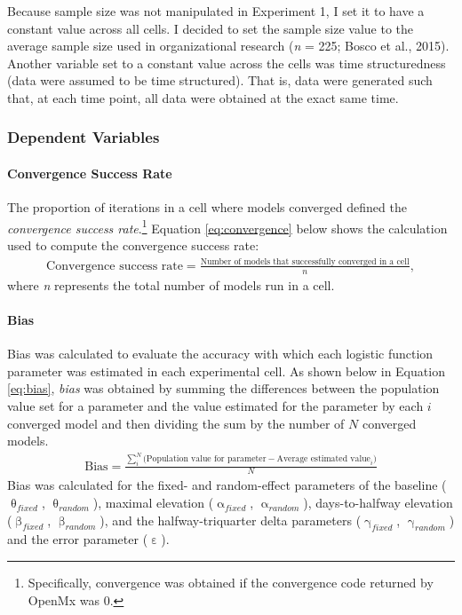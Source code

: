 \documentclass[
12pt, %
twoside,
english]{guelphthesis}
\theoremstyle{definition}
\theoremstyle{definition}
\theoremstyle{definition}
\theoremstyle{definition}
\theoremstyle{remark}
\begin{document}
Because sample size was not manipulated in Experiment 1, I set it to have a constant value across all cells. I decided to set the sample size value to the average sample size used in organizational research (\emph{n} = 225; Bosco et al., 2015). Another variable set to a constant value across the cells was time structuredness (data were assumed to be time structured). That is, data were generated such that, at each time point, all data were obtained at the exact same time.

\hypertarget{dependent-variables}{%
\subsubsection{Dependent Variables}\label{dependent-variables}}

\hypertarget{convergence}{%
\paragraph{Convergence Success Rate}\label{convergence}}

The proportion of iterations in a cell where models converged defined
the \emph{convergence success rate}.\footnote{Specifically, convergence was obtained if the convergence code returned by OpenMx was 0.} Equation \eqref{eq:convergence} below shows the calculation used to compute the convergence success rate:
\begin{align}
  \text{Convergence success rate} =  \frac{\text{Number of models that successfully converged in a cell}}{n},
  \label{eq:convergence} 
\end{align}
\noindent where \emph{n} represents the total number of models run in a cell.

\hypertarget{bias-comp}{%
\paragraph{Bias}\label{bias-comp}}

Bias was calculated to evaluate the accuracy with which each logistic
function parameter was estimated in each experimental cell. As shown below in Equation
\eqref{eq:bias}, \emph{bias} was obtained by summing the differences
between the population value set for a parameter and the value estimated for the parameter by each \(i\) converged model and then dividing the sum by the number of \(N\) converged models.
\begin{align}
  \text{Bias} = \frac{\sum_i^N\text{(Population value for parameter} - \text{Average estimated value}_i)}{N}
  \label{eq:bias} 
\end{align}
\noindent Bias was calculated for the fixed- and random-effect parameters of the baseline (\(\uptheta_{fixed}\), \(\uptheta_{random}\)), maximal elevation (\(\upalpha_{fixed}\), \(\upalpha_{random}\)), days-to-halfway elevation (\(\upbeta_{fixed}\), \(\upbeta_{random}\)), and the halfway-triquarter delta parameters (\(\upgamma_{fixed}\), \(\upgamma_{random}\)) and the error parameter (\(\upepsilon\)).
\end{document}
